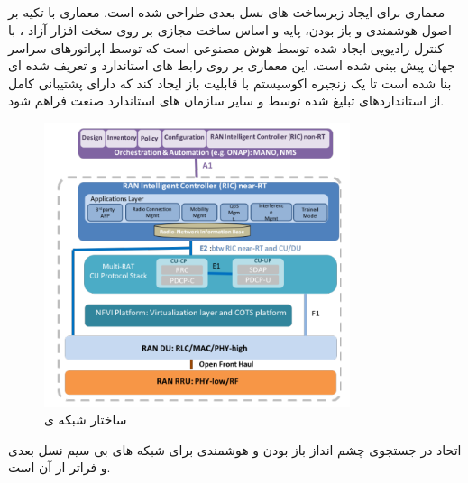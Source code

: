 \subsection{}
معماری  برای ایجاد زیرساخت های  نسل بعدی طراحی شده است.
معماری  با تکیه بر اصول هوشمندی و باز بودن، پایه و اساس ساخت  مجازی بر روی سخت افزار آزاد ، با کنترل رادیویی ایجاد شده توسط هوش مصنوعی است که توسط اپراتورهای سراسر جهان پیش بینی شده است.
این معماری بر روی رابط های استاندارد و تعریف شده ای بنا شده است تا یک زنجیره اکوسیستم با قابلیت باز ایجاد کند که دارای پشتیبانی کامل از استانداردهای تبلیغ شده توسط  و سایر سازمان های استاندارد صنعت فراهم شود.
\begin{figure}[H]
  \centering
    \includegraphics[width=0.8\textwidth]{./fig/oran1}
  \caption{ساختار شبکه ی  \cite{oranWP}}
  \label{fig:ORAN}
\end{figure}
اتحاد  در جستجوی چشم انداز باز بودن و هوشمندی برای شبکه های بی سیم نسل بعدی و فراتر از آن است\cite{oranWP}.
